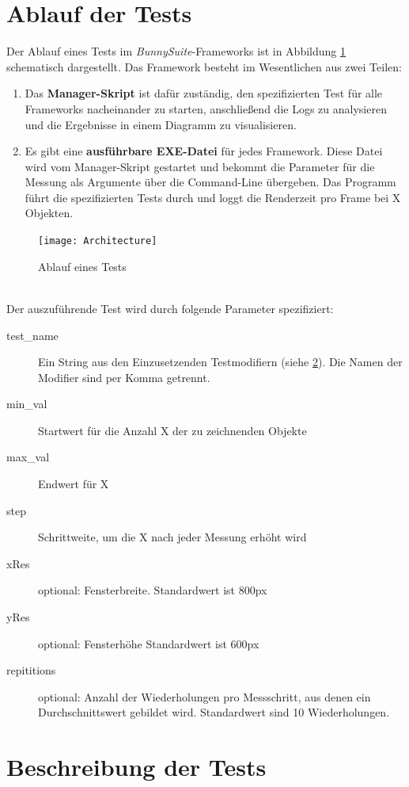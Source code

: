 \section{Ablauf der Tests}
Der Ablauf eines Tests im \textit{BunnySuite}-Frameworks ist in Abbildung \ref{dia:architecture} schematisch dargestellt. Das Framework besteht im Wesentlichen aus zwei Teilen:
\begin{enumerate}
\item Das \textbf{Manager-Skript} ist dafür zuständig, den spezifizierten Test für alle Frameworks nacheinander zu starten, anschließend die Logs zu analysieren und die Ergebnisse in einem Diagramm zu visualisieren.
\item Es gibt eine \textbf{ausführbare EXE-Datei} für jedes Framework. Diese Datei wird vom Manager-Skript gestartet und bekommt die Parameter für die Messung als Argumente über die Command-Line übergeben. Das Programm führt die spezifizierten Tests durch und loggt die Renderzeit pro Frame bei X Objekten.
\end{enumerate}
\begin{figure}[h]
\caption{Ablauf eines Tests}
\centering
\texttt{[image: Architecture]}
\label{dia:architecture}
\end{figure}
~\\
Der auszuführende Test wird durch folgende Parameter spezifiziert:\\
\begin{description}
\item[test\_name] Ein String aus den Einzusetzenden Testmodifiern (siehe \ref{sec:tests}). Die Namen der Modifier sind per Komma getrennt.
\item[min\_val] Startwert für die Anzahl X der zu zeichnenden Objekte
\item[max\_val] Endwert für X
\item[step] Schrittweite, um die X nach jeder Messung erhöht wird
\item[xRes] optional: Fensterbreite. Standardwert ist 800px
\item[yRes] optional: Fensterhöhe Standardwert ist 600px
\item[repititions] optional: Anzahl der Wiederholungen pro Messschritt, aus denen ein Durchschnittswert gebildet wird. Standardwert sind 10 Wiederholungen.
\end{description}

\section{Beschreibung der Tests}
\label{sec:tests}

